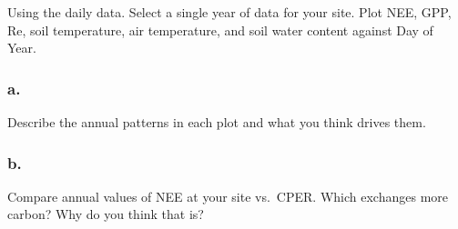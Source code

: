 \documentclass[
]{article}
\begin{document}
Using the daily data. Select a single year of data for your site. Plot
NEE, GPP, Re, soil temperature, air temperature, and soil water content
against Day of Year.

\hypertarget{a.-1}{%
\subsubsection{a.}\label{a.-1}}

Describe the annual patterns in each plot and what you think drives
them.

\hypertarget{b.-1}{%
\subsubsection{b.}\label{b.-1}}

Compare annual values of NEE at your site vs.~CPER. Which exchanges more
carbon? Why do you think that is?
\end{document}
